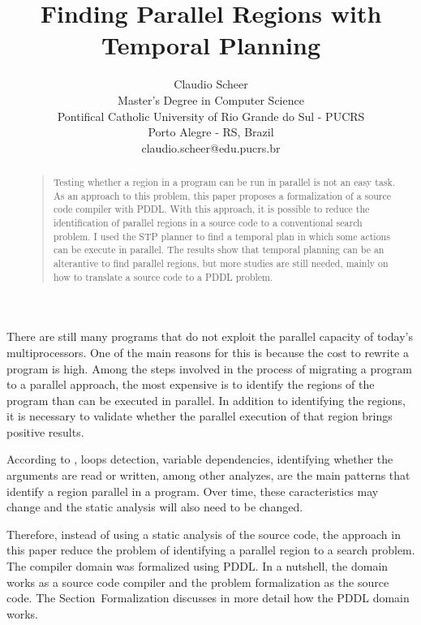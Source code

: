 \documentclass[letterpaper]{article}
\begin{document}
\title{Finding Parallel Regions with Temporal Planning}
\author{Claudio Scheer\\
    Master's Degree in Computer Science\\
    Pontifical Catholic University of Rio Grande do Sul - PUCRS\\
    Porto Alegre - RS, Brazil\\
    claudio.scheer@edu.pucrs.br\\
}
\maketitle

\begin{abstract}
    \begin{quote}
        Testing whether a region in a program can be run in parallel is not an easy task. As an approach to this problem, this paper proposes a formalization of a source code compiler with PDDL. With this approach, it is possible to reduce the identification of parallel regions in a source code to a conventional search problem. I used the STP planner to find a temporal plan in which some actions can be execute in parallel. The results show that temporal planning can be an alterantive to find parallel regions, but more studies are still needed, mainly on how to translate a source code to a PDDL problem.
    \end{quote}
\end{abstract}

\noindent There are still many programs that do not exploit the parallel capacity of today's multiprocessors. One of the main reasons for this is because the cost to rewrite a program is high. Among the steps involved in the process of migrating a program to a parallel approach, the most expensive is to identify the regions of the program than can be executed in parallel. In addition to identifying the regions, it is necessary to validate whether the parallel execution of that region brings positive results.

According to \cite{doi:10.1177/1094342017695639}, loops detection, variable dependencies, identifying whether the arguments are read or written, among other analyzes, are the main patterns that identify a region parallel in a program. Over time, these caracteristics may change and the static analysis will also need to be changed.

Therefore, instead of using a static analysis of the source code, the approach in this paper reduce the problem of identifying a parallel region to a search problem. The compiler domain was formalized using PDDL. In a nutshell, the domain works as a source code compiler and the problem formalization as the source code. The Section~Formalization discusses in more detail how the PDDL domain works.
\end{document}
